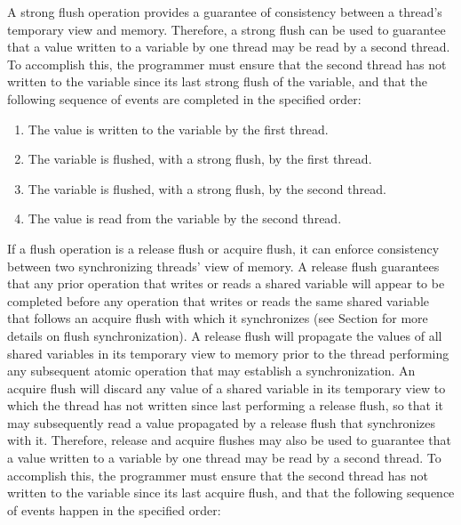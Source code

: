 A strong flush operation provides a guarantee of consistency between a thread’s
temporary view and memory. Therefore, a strong flush can be used to
guarantee that a value written to a variable by one thread may be read by a
second thread. To accomplish this, the programmer must ensure that the second
thread has not written to the variable since its last strong flush of the
variable, and that the following sequence of events are completed in the specified
order:

\begin{enumerate}
    \item The value is written to the variable by the first thread.
    \item The variable is flushed, with a strong flush, by the first thread.
    \item The variable is flushed, with a strong flush, by the second thread.
    \item The value is read from the variable by the second thread.
\end{enumerate}

If a flush operation is a release flush or acquire flush, it can enforce
consistency between two synchronizing threads' view of memory.  A release
flush guarantees that any prior operation that writes or reads a shared
variable will appear to be completed before any operation that writes or reads
the same shared variable that follows an acquire flush with which it
synchronizes (see Section  for more details on
flush synchronization).  A release flush will propagate the values of all
shared variables in its temporary view to memory prior to the thread
performing any subsequent atomic operation that may establish a
synchronization. An acquire flush will discard any value of a shared variable
in its temporary view to which the thread has not written since last performing
a release flush, so that it may subsequently read a value propagated by a
release flush that synchronizes with it.   Therefore, release and acquire
flushes may also be used to guarantee that a value written to a variable by
one thread may be read by a second thread. To accomplish this, the programmer
must ensure that the second thread has not written to the variable since its
last acquire flush, and that the following sequence of events happen in the
specified order:

